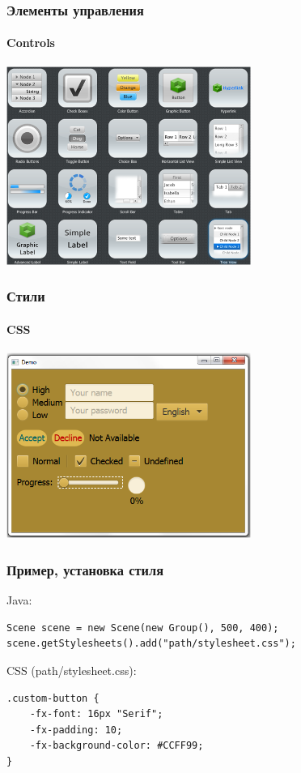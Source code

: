 \documentclass[xetex,mathserif,serif]{beamer}
\begin{document}
	\begin{frame}
		\frametitle{Элементы управления}
		\framesubtitle{Controls}
		\begin{center}
			\includegraphics[width=0.6\textwidth]{javaFxControls.png}
		\end{center}
	\end{frame}

	\begin{frame}
		\frametitle{Стили}
		\framesubtitle{CSS}
		\begin{center}
			\includegraphics[width=0.6\textwidth]{styles.png}
		\end{center}
	\end{frame}

	\begin{frame}[fragile]
		\frametitle{Пример, установка стиля}
		Java:
		\begin{verbatim}
Scene scene = new Scene(new Group(), 500, 400);
scene.getStylesheets().add("path/stylesheet.css");
		\end{verbatim}
		\vspace{1cm}
		CSS (path/stylesheet.css):
		\begin{verbatim}
.custom-button {
    -fx-font: 16px "Serif";
    -fx-padding: 10;
    -fx-background-color: #CCFF99;
}
		\end{verbatim}
\end{frame}
\end{document}
